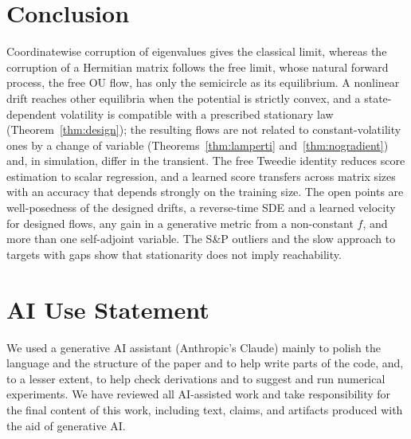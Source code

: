 \documentclass[11pt]{article}
\theoremstyle{plain}
\theoremstyle{definition}
\theoremstyle{remark}
\begin{document}
\section{Conclusion}\label{sec:conclusion}

Coordinatewise corruption of eigenvalues gives the classical limit, whereas the corruption of a Hermitian matrix follows the free limit, whose
natural forward process, the free OU flow, has only the semicircle as its equilibrium. A nonlinear drift reaches other equilibria when the potential is
strictly convex, and a state-dependent volatility is compatible with a prescribed stationary law (Theorem~\ref{thm:design}); the resulting flows are not related
to constant-volatility ones by a change of variable (Theorems~\ref{thm:lamperti} and~\ref{thm:nogradient}) and, in simulation, differ in the transient. The
free Tweedie identity reduces score estimation to scalar regression, and a learned score transfers across matrix sizes with an accuracy that depends strongly
on the training size. The open points are well-posedness of the designed drifts, a reverse-time SDE and a learned velocity for designed flows, any gain in a
generative metric from a non-constant $f$, and more than one self-adjoint variable. The S\&P outliers and the slow approach to targets with gaps show that
stationarity does not imply reachability.\label{end:maintext}

\section*{AI Use Statement}
We used a generative AI assistant (Anthropic's Claude) mainly to polish the language and the structure of the paper and to
help write parts of the code, and, to a lesser extent, to help check derivations and to suggest and run numerical
experiments. We have reviewed all AI-assisted work and take responsibility for the final content of this work, including
text, claims, and artifacts produced with the aid of generative AI.
\end{document}
